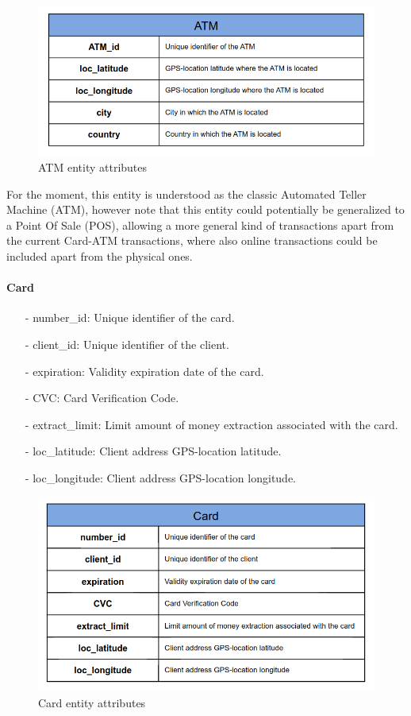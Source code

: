 \documentclass{article}
\begin{document}
\begin{figure}[H]
    \centering
    \includegraphics[scale = 0.4]{images/atm.png}
    \caption{ATM entity attributes}
    \label{img:pg-atm}
\end{figure}

For the moment, this entity is understood as the classic Automated Teller Machine (ATM), however note that this entity could potentially be generalized to a Point Of Sale (POS), allowing a more general kind of transactions apart from the current Card-ATM transactions, where also online transactions could be included apart from the physical ones.

\paragraph{Card}

\begin{itemize}
\item[-] number\_id: Unique identifier of the card.
\item[-] client\_id: Unique identifier of the client.
\item[-] expiration: Validity expiration date of the card.
\item[-] CVC: Card Verification Code.
\item[-] extract\_limit: Limit amount of money extraction associated with the card.
\item[-] loc\_latitude: Client address GPS-location latitude.
\item[-] loc\_longitude: Client address GPS-location longitude.
\end{itemize}

\begin{figure}[H]
    \centering
    \includegraphics[scale = 0.4]{images/card.png}
    \caption{Card entity attributes}
    \label{img:pg-card}
\end{figure}
\end{document}
